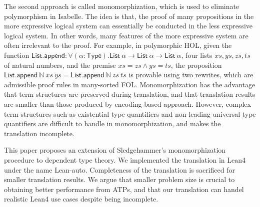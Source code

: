   \noindent The second approach is called monomorphization, which is used to eliminate polymorphism
  in Isabelle. The idea is that, the proof of many propositions in the more expressive logical
  system can essentially be conducted in the less expressive logical system. In other words,
  many features of the more expressive system are often irrelevant to the proof. For example,
  in polymorphic HOL, given the function
  $\mathsf{List.append} : \forall (\alpha : \mathsf{Type}). \mathsf{List} \ \alpha \to \mathsf{List} \ \alpha \to \mathsf{List} \ \alpha$,
  four lists $xs, ys, zs, ts$ of natural numbers, and the premise $xs = zs \land ys = ts$, the proposition
  $\mathsf{List.append} \ \mathbb{N} \ xs \ ys = \mathsf{List.append} \ \mathbb{N} \ zs \ ts$ is
  provable using two rewrites, which are admissible proof rules in many-sorted FOL. Monomorphization
  has the advantage that term structures are preserved during translation, and that
  translation results are smaller than those produced by encoding-based approach.
  However, complex term structures such as existential type quantifiers and non-leading universal
  type quantifiers are difficult to handle in monomorphization, and makes the translation incomplete.

  \noindent This paper proposes an extension of Sledgehammer's monomorphization procedure
  to dependent type theory. We implemented the translation in Lean4 under the name Lean-auto.
  Completeness of the translation is sacrificed for smaller translation
  results. We argue that smaller problem size is crucial to obtaining better performance
  from ATPs, and that our translation can handel realistic Lean4 use cases despite being incomplete.